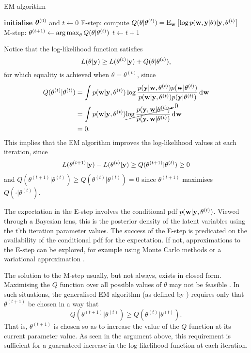 \begin{algorithm}[H]
\caption{EM algorithm}\label{alg:EM4}
\begin{algorithmic}[1]
  \State \textbf{initialise} ${\bm\theta}^{(0)}$ and $t\gets 0$
    \State E-step: compute $Q(\theta|\theta^{(t)}) = \operatorname{E}_{\mathbf w} \left[\log p({\mathbf w},{\mathbf y}|\theta) | {\mathbf y}, \theta^{(t)} \right]$
    \State M-step: $\theta^{(t+1)} \gets \operatorname*{arg\,max}_\theta Q(\theta|\theta^{(t)})$
    \State $t \gets t + 1$
  \EndWhile
\end{algorithmic}
\end{algorithm}

\vspace{-0.9em}
Notice that the log-likelihood function satisfies
\begin{equation}
  L(\theta|{\mathbf y}) \geq L(\theta^{(t)}|{\mathbf y}) + Q(\theta|\theta^{(t)}),
\end{equation}
for which equality is achieved when $\theta = \theta^{(t)}$, since
\begin{align*}
  Q(\theta^{(t)}|\theta^{(t)})
  &= \int p({\mathbf w}|{\mathbf y},\theta^{(t)}) \log \frac{p({\mathbf y}|{\mathbf w},\theta^{(t)})p({\mathbf w}|\theta^{(t)})}{p({\mathbf w}|{\mathbf y},\theta^{(t)})p({\mathbf y}|\theta^{(t)})} \operatorname{d}\hspace{0.5pt}\!{\mathbf w} \\
  &= \int p({\mathbf w}|{\mathbf y},\theta^{(t)}) \cancelto{0}{\log \frac{p({\mathbf y},{\mathbf w}|\theta^{(t)})}{p({\mathbf y},{\mathbf w}|\theta^{(t)})}} \operatorname{d}\hspace{0.5pt}\!{\mathbf w}\\
  &=0.
\end{align*}
This implies that the EM algorithm improves the log-likelihood values at each iteration, since
\begin{align*}
  L(\theta^{(t+1)}|{\mathbf y}) - L(\theta^{(t)}|{\mathbf y}) \geq  Q(\theta^{(t+1)}|\theta^{(t)}) \geq 0
\end{align*}
and $Q(\theta^{(t+1)}|\theta^{(t)}) \geq Q(\theta^{(t)}|\theta^{(t)}) = 0$ since $\theta^{(t+1)}$ maximises $Q(\cdot|\theta^{(t)})$.

The expectation in the E-step involves the conditional pdf $p({\mathbf w}|{\mathbf y},\theta^{(t)})$.
Viewed through a Bayesian lens, this is the posterior density of the latent variables using the $t$'th iteration parameter values.
The success of the E-step is predicated on the availability of the conditional pdf for the expectation.
If not, approximations to the E-step can be explored, for example using Monte Carlo methods \citep{wei1990monte} or a variational approximation \citep{beal2003variational}.

The solution to the M-step usually, but not always, exists in closed form.
Maximising the $Q$ function over all possible values of $\theta$ may not be feasible \citep{mclachlan2007algorithm}.
In such situations, the generalised EM algorithm (as defined by \cite{dempster1977maximum}) requires only that $\theta^{(t+1)}$ be chosen in a way that
\[
  Q(\theta^{(t+1)}|\theta^{(t)}) \geq Q(\theta^{(t)}|\theta^{(t)}).
\]
That is, $\theta^{(t+1)}$ is chosen so as to increase the value of the $Q$ function at its current parameter value.
As seen in the argument above, this requirement is sufficient for a guaranteed increase in the log-likelihood function at each iteration.


